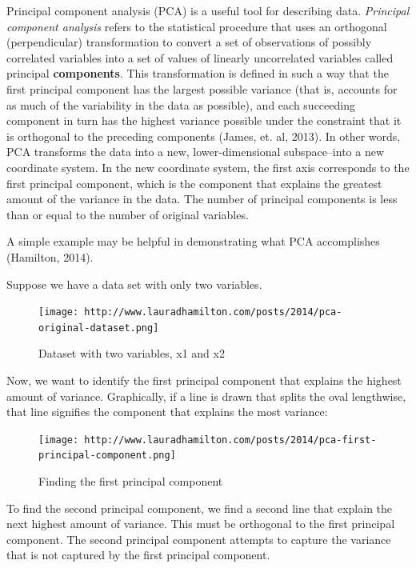 \documentclass[12pt,twoside]{reedthesis}
\begin{document}
  Principal component analysis (PCA) is a useful tool for describing data.
  \emph{Principal component analysis} refers to the statistical procedure
  that uses an orthogonal (perpendicular) transformation to convert a set
  of observations of possibly correlated variables into a set of values of
  linearly uncorrelated variables called principal \textbf{components}.
  This transformation is defined in such a way that the first principal
  component has the largest possible variance (that is, accounts for as
  much of the variability in the data as possible), and each succeeding
  component in turn has the highest variance possible under the constraint
  that it is orthogonal to the preceding components (James, et. al, 2013).
  In other words, PCA transforms the data into a new, lower-dimensional
  subspace--into a new coordinate system. In the new coordinate system,
  the first axis corresponds to the first principal component, which is
  the component that explains the greatest amount of the variance in the
  data. The number of principal components is less than or equal to the
  number of original variables.
  
  A simple example may be helpful in demonstrating what PCA accomplishes
  (Hamilton, 2014).
  
  Suppose we have a data set with only two variables.
  
  \begin{figure}[htbp]
  \centering
  \texttt{[image: http://www.lauradhamilton.com/posts/2014/pca-original-dataset.png]}
  \caption{Dataset with two variables, x1 and x2}
  \end{figure}
  
  Now, we want to identify the first principal component that explains the
  highest amount of variance. Graphically, if a line is drawn that splits
  the oval lengthwise, that line signifies the component that explains the
  most variance:
  
  \begin{figure}[htbp]
  \centering
  \texttt{[image: http://www.lauradhamilton.com/posts/2014/pca-first-principal-component.png]}
  \caption{Finding the first principal component}
  \end{figure}
  
  \newpage
  
  To find the second principal component, we find a second line that
  explain the next highest amount of variance. This must be orthogonal to
  the first principal component. The second principal component attempts
  to capture the variance that is not captured by the first principal
  component.
  
\end{document}
